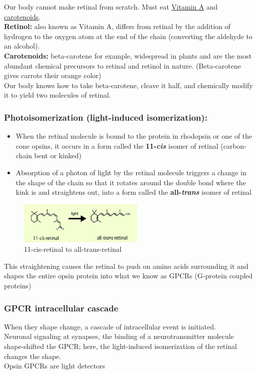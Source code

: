 \documentclass{article}
\begin{document}
\noindent Our body cannot make retinal from scratch. Must eat \underline{Vitamin A} and \underline{carotenoids}. \\

\noindent \textbf{Retinol:} also known as Vitamin A, differs from retinal by the addition of hydrogen to the oxygen atom at the end of the chain (converting the aldehyde to an alcohol). \\
\textbf{Carotenoids:} beta-carotene for example, widespread in plants and are the most abundant chemical precursors to retinal and retinol in nature. (Beta-carotene gives carrots their orange color) \\

Our body knows how to take beta-carotene, cleave it half, and chemically modify it to yield two molecules of retinal. 

\subsubsection{Photoisomerization (light-induced isomerization):} 
\begin{itemize}
    \item When the retinal molecule is bound to the protein in rhodopsin or one of the cone opsins, it occurs in a form called the \textbf{11-\textit{cis}} isomer of retinal (carbon-chain bent or kinked)
    \item Absorption of a photon of light by the retinal molecule triggers a change in the shape of the chain so that it rotates around the double bond where the kink is and straightens out, into a form called the \textbf{all-\textit{trans}} isomer of retinal
\end{itemize}

\begin{figure}[htp]
\centering
\includegraphics[width=6cm]{images/CistoTrans.png}
\caption{11-cis-retinal to all-trans-retinal}
\label{fig: cis to trans}
\end{figure}

This straightening causes the retinal to push on amino acids surrounding it and shapes the entire opsin protein into what we know as GPCRs (G-protein coupled proteins) 

\subsubsection{GPCR intracellular cascade}
When they shape change, a cascade of intracellular event is initiated. \\
Neuronal signaling at synapses, the binding of a neurotransmitter molecule shape-shifted the GPCR; here, the light-induced isomerization of the retinal changes the shape. \\
Opsin GPCRs are light detectors \\
\end{document}
